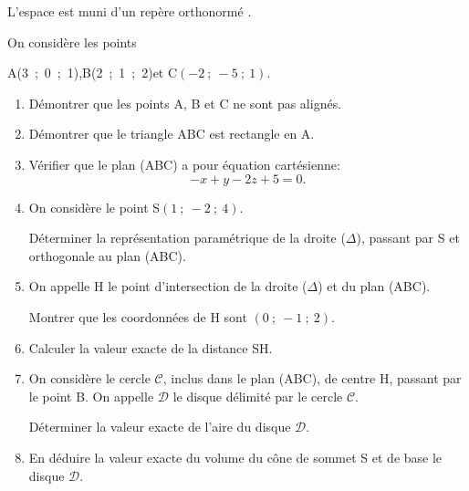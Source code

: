\medskip

L'espace est muni d'un repère orthonormé \Oijk.

On considère les points 
\begin{center}A(3~;~0~;~1),\qquad  B(2~;~1~;~2)\quad  et \quad C$(- 2~;~- 5~;~1)$.\end{center}

\smallskip

\begin{enumerate}
\item Démontrer que les points A, B et C ne sont pas alignés.
\item Démontrer que le triangle ABC est rectangle en A.
\item Vérifier que le plan (ABC) a pour équation cartésienne:
\[-x + y - 2z + 5 = 0.\]

\item On considère le point S$(1~;~-2~;~4)$.

Déterminer la représentation paramétrique de la droite ($\Delta$), passant par S et
orthogonale au plan (ABC).
\item On appelle H le point d'intersection de la droite ($\Delta$) et du plan (ABC).

Montrer que les coordonnées de H sont $(0~;~-1~;~2)$.
\item Calculer la valeur exacte de la distance SH.
\item On considère le cercle $\mathcal{C}$, inclus dans le plan (ABC), de centre H, passant par le
point B. On appelle $\mathcal{D}$ le disque délimité par le cercle $\mathcal{C}$.

Déterminer la valeur exacte de l'aire du disque $\mathcal{D}$.
\item En déduire la valeur exacte du volume du cône de sommet S et de base le
disque $\mathcal{D}$.
\end{enumerate}

\medskip

